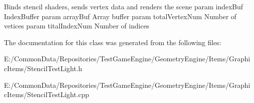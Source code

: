 Binds stencil shaders, sends vertex data and renders the scene param index\+Buf Index\+Buffer param array\+Buf Array buffer param total\+Vertex\+Num Number of vetices param tital\+Index\+Num Number of indices 

The documentation for this class was generated from the following files\+:\begin{DoxyCompactItemize}
\item 
E\+:/\+Common\+Data/\+Repositories/\+Test\+Game\+Engine/\+Geometry\+Engine/\+Items/\+Graphic\+Items/Stencil\+Test\+Light.\+h\item 
E\+:/\+Common\+Data/\+Repositories/\+Test\+Game\+Engine/\+Geometry\+Engine/\+Items/\+Graphic\+Items/Stencil\+Test\+Light.\+cpp\end{DoxyCompactItemize}
